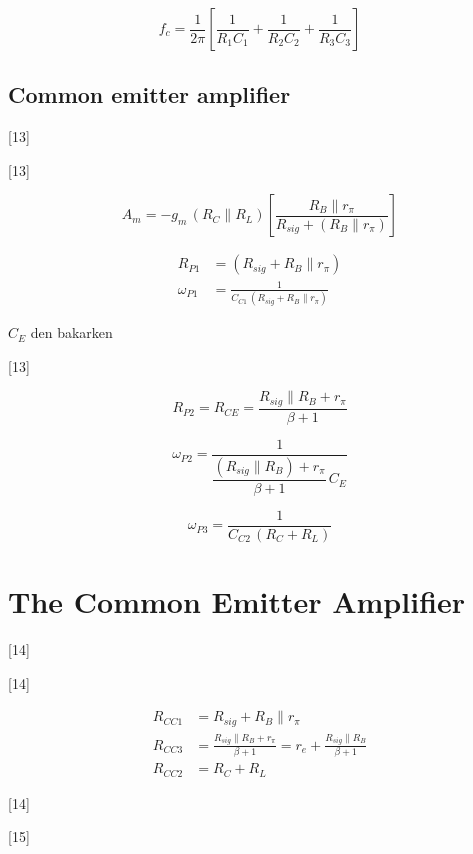 \documentclass[11pt,a4paper]{article}
\begin{document}
\[ f_c = \frac{1}{2\pi}\left[\frac{1}{R_1C_1}+\frac{1}{R_2C_2}+\frac{1}{R_3C_3}\right] \]

\subsection{Common emitter amplifier}

[13]

[13]

\[ A_m = -g_m\,(R_C\parallel R_L)\left[\frac{R_B\parallel r_\pi}{R_{sig}+(R_B\parallel r_\pi)}\right] \]

\begin{align*}
R_{P1} &= (R_{sig} + R_B\parallel r_\pi)\\
\omega_{P1} &= \frac{1}{C_{C1}\,(R_{sig}+R_B\parallel r_\pi)}
\end{align*}

\noindent $C_E$ den bakarken

[13]

\[ R_{P2} = R_{CE} = \frac{R_{sig}\parallel R_B + r_\pi}{\beta+1} \]

\[ \omega_{P2} = \frac{1}{\dfrac{(R_{sig}\parallel R_B)+r_\pi}{\beta+1}\,C_E} \]

\[ \omega_{P3} = \frac{1}{C_{C2}\,(R_C+R_L)} \]

\section{The Common Emitter Amplifier}

[14]

[14]

\begin{align*}
R_{CC1} &= R_{sig} + R_B\parallel r_\pi\\
R_{CC3} &= \frac{R_{sig}\parallel R_B + r_\pi}{\beta+1} = r_e + \frac{R_{sig}\parallel R_B}{\beta+1}\\
R_{CC2} &= R_C + R_L
\end{align*}

[14]

[15]
\end{document}
